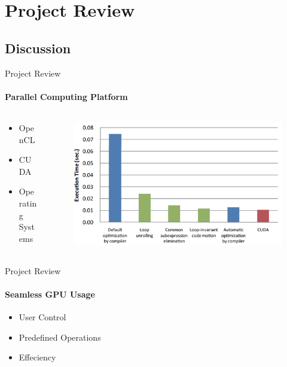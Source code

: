 \section{Project Review}

	\subsection{Discussion}
	\begin{frame}[t]{Project Review}\framesubtitle{Parallel Computing Platform}
	\begin{columns}[T]
	\begin{column}{0.48\textwidth}
		\begin{itemize}
			\item OpenCL
			\item CUDA
			\item Operating Systems
		\end{itemize}
	\end{column}
	\begin{column}{.48\textwidth}
      \begin{figure}
         \includegraphics[width=1\textwidth]{images/opencloptimisation.png}
      \end{figure}
    \end{column}
    \end{columns}
	\end{frame}

	\begin{frame}[t]{Project Review}\framesubtitle{Seamless GPU Usage}
		\begin{itemize}
			\item User Control
			\item Predefined Operations
			\item Effeciency
		\end{itemize}
	\end{frame}

